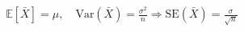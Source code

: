 \documentclass[preview]{standalone}
\begin{document}
\begin{align*}
\mathbb{E}[\bar{X}] = \mu, \quad \mathrm{Var}(\bar{X}) = \frac{\sigma^2}{n} \Longrightarrow \mathrm{SE}(\bar{X}) = \frac{\sigma}{\sqrt{n}}
\end{align*}
\end{document}
